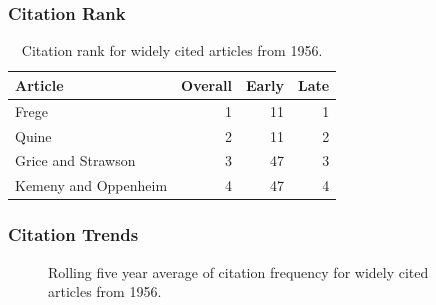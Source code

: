 \documentclass[
  10pt,
  letterpaper,
  DIV=11,
  numbers=noendperiod,
  twoside]{scrartcl}
\begin{document}
\subsubsection*{Citation Rank}\label{sec-rank-1956}

\begin{longtable}[]{@{}lrrr@{}}

\caption{\label{tbl-citation-rank-1956}Citation rank for widely cited
articles from 1956.}

\tabularnewline

\toprule\noalign{}
Article & Overall & Early & Late \\
\midrule\noalign{}
\endhead
\bottomrule\noalign{}
\endlastfoot
Frege & 1 & 11 & 1 \\
Quine & 2 & 11 & 2 \\
Grice and Strawson & 3 & 47 & 3 \\
Kemeny and Oppenheim & 4 & 47 & 4 \\

\end{longtable}

\subsubsection*{Citation Trends}\label{sec-trends-1956}

\begin{figure}


\caption{\label{fig-citation-spaghetti-1956}Rolling five year average of
citation frequency for widely cited articles from 1956.}

\end{figure}%
\end{document}
